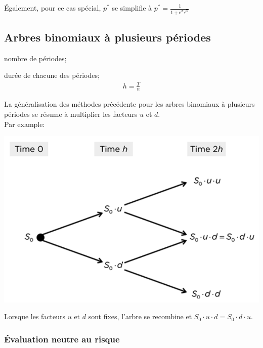 \documentclass[10pt, french]{article}
\begin{document}
\begin{multicols*}{2}
Également, pour ce cas spécial, $p^{*}$ se simplifie à $p^{*}	=	\frac{1}{1 + \textrm{e}^{\sigma \sqrt{h}}}$

\subsection{Arbres binomiaux à plusieurs périodes}

\begin{distributions}[Notation]
\begin{description}[leftmargin = *]
	\item[$n$]	nombre de périodes;
	\item[$h$]	durée de chacune des périodes;
		\begin{align*}
		h	=	\frac{T}{n}
		\end{align*}
\end{description}
\end{distributions}

La généralisation des méthodes précédente pour les arbres binomiaux à plusieurs périodes se résume à multiplier les facteurs $u$ et $d$. \\
Par example:
\begin{center}
	\includegraphics[scale=0.33]{../../src/ACT-2011/mult-per-bin-tree.png}
\end{center}

Lorsque les facteurs $u$ et $d$ sont fixes, l'arbre se recombine et $S_{0} \cdot u \cdot d = S_{0} \cdot d \cdot u$.

\subsubsection*{Évaluation neutre au risque}


\end{multicols*}
\end{document}
